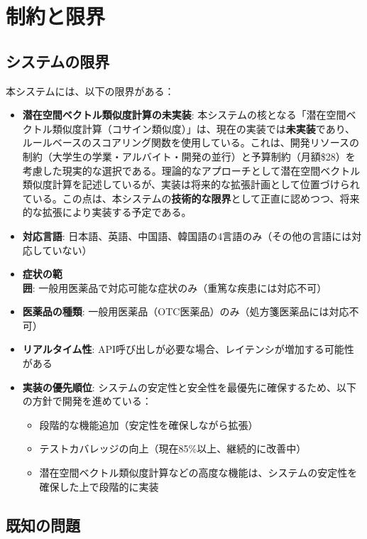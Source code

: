 \documentclass[a4paper,11pt,ja=standard,xelatex]{bxjsarticle}
\theoremstyle{definition}
\begin{document}
\section{制約と限界}

\subsection{システムの限界}

本システムには、以下の限界がある：

\begin{itemize}
\item \textbf{潜在空間ベクトル類似度計算の未実装}: 本システムの核となる「潜在空間ベクトル類似度計算（コサイン類似度）」は、現在の実装では\textbf{未実装}であり、ルールベースのスコアリング関数を使用している。これは、開発リソースの制約（大学生の学業・アルバイト・開発の並行）と予算制約（月額\$28）を考慮した現実的な選択である。理論的なアプローチとして潜在空間ベクトル類似度計算を記述しているが、実装は将来的な拡張計画として位置づけられている。この点は、本システムの\textbf{技術的な限界}として正直に認めつつ、将来的な拡張により実装する予定である。

\item \textbf{対応言語}: 日本語、英語、中国語、韓国語の4言語のみ（その他の言語には対応していない）

\item \textbf{症状の範囲}: 一般用医薬品で対応可能な症状のみ（重篤な疾患には対応不可）

\item \textbf{医薬品の種類}: 一般用医薬品（OTC医薬品）のみ（処方箋医薬品には対応不可）

\item \textbf{リアルタイム性}: API呼び出しが必要な場合、レイテンシが増加する可能性がある

\item \textbf{実装の優先順位}: システムの安定性と安全性を最優先に確保するため、以下の方針で開発を進めている：
  \begin{itemize}
  \item 段階的な機能追加（安定性を確保しながら拡張）
  \item テストカバレッジの向上（現在85\%以上、継続的に改善中）
  \item 潜在空間ベクトル類似度計算などの高度な機能は、システムの安定性を確保した上で段階的に実装
  \end{itemize}
\end{itemize}

\subsection{既知の問題}
\end{document}
